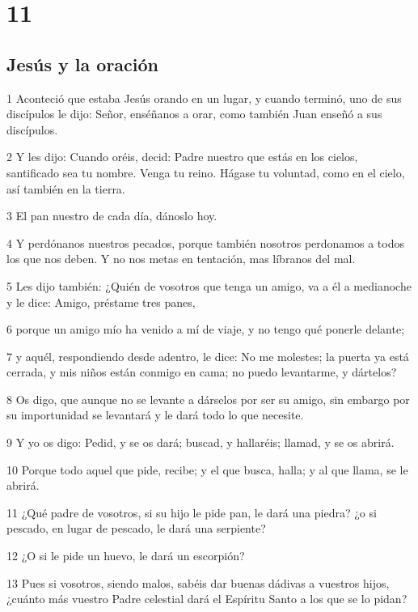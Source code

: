 \chapter{11}

\section*{Jesús y la oración}

\par 1 Aconteció que estaba Jesús orando en un lugar, y cuando terminó, uno de sus discípulos le dijo: Señor, enséñanos a orar, como también Juan enseñó a sus discípulos.
\par 2 Y les dijo: Cuando oréis, decid: Padre nuestro que estás en los cielos, santificado sea tu nombre. Venga tu reino. Hágase tu voluntad, como en el cielo, así también en la tierra.
\par 3 El pan nuestro de cada día, dánoslo hoy.
\par 4 Y perdónanos nuestros pecados, porque también nosotros perdonamos a todos los que nos deben. Y no nos metas en tentación, mas líbranos del mal.
\par 5 Les dijo también: ¿Quién de vosotros que tenga un amigo, va a él a medianoche y le dice: Amigo, préstame tres panes,
\par 6 porque un amigo mío ha venido a mí de viaje, y no tengo qué ponerle delante;
\par 7 y aquél, respondiendo desde adentro, le dice: No me molestes; la puerta ya está cerrada, y mis niños están conmigo en cama; no puedo levantarme, y dártelos?
\par 8 Os digo, que aunque no se levante a dárselos por ser su amigo, sin embargo por su importunidad se levantará y le dará todo lo que necesite.
\par 9 Y yo os digo: Pedid, y se os dará; buscad, y hallaréis; llamad, y se os abrirá.
\par 10 Porque todo aquel que pide, recibe; y el que busca, halla; y al que llama, se le abrirá.
\par 11 ¿Qué padre de vosotros, si su hijo le pide pan, le dará una piedra? ¿o si pescado, en lugar de pescado, le dará una serpiente?
\par 12 ¿O si le pide un huevo, le dará un escorpión?
\par 13 Pues si vosotros, siendo malos, sabéis dar buenas dádivas a vuestros hijos, ¿cuánto más vuestro Padre celestial dará el Espíritu Santo a los que se lo pidan?

